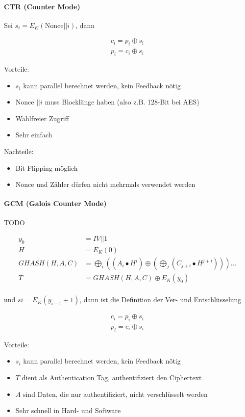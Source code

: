 \paragraph{CTR (Counter Mode)}

Sei $s_i = E_K(\text{Nonce}||i)$, dann 

\begin{align*}
    c_i = p_i \oplus s_i \\
    p_i = c_i \oplus s_i
\end{align*}

Vorteile: 
\begin{itemize}
    \item $s_i$ kann parallel berechnet werden, kein Feedback nötig
    \item Nonce $|| i$ muss Blocklänge haben (also z.B. 128-Bit bei AES)
    \item Wahlfreier Zugriff
    \item Sehr einfach
\end{itemize}

Nachteile: 
\begin{itemize}
    \item Bit Flipping möglich
    \item Nonce und Zähler dürfen nicht mehrmals verwendet werden
\end{itemize}

\paragraph{GCM (Galois Counter Mode)}

TODO

\begin{align*}
    y_0 &= IV||1 \\ 
    H &= E_K(0) \\
    GHASH(H,A,C) &= \bigoplus_i \left((A_i \bullet H^i ) \oplus \left(\bigoplus_j (C_{j+i} \bullet H^{j+i} )\right)\right)\ldots\\
    T &= GHASH(H,A,C) \oplus E_K(y_0) \\
\end{align*}

und $si = E_K(y_{i-1}+1)$, dann ist die Definition der Ver- und Entschlüsselung

\begin{align*}
    c_i = p_i \oplus s_i \\
    p_i = c_i \oplus s_i
\end{align*}

Vorteile: 
\begin{itemize}
    \item $s_i$ kann parallel berechnet werden, kein Feedback nötig
    \item $T$ dient als Authentication Tag, authentifiziert den Ciphertext
    \item $A$ sind Daten, die nur authentifiziert, nicht verschlüsselt werden
    \item Sehr schnell in Hard- und Software
\end{itemize}

